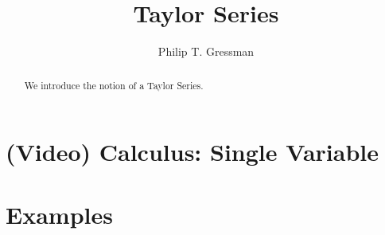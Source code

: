 \documentclass{ximera}
\title{Taylor Series}
\author{Philip T. Gressman}
\begin{document}
\begin{abstract}
We introduce the notion of a Taylor Series.
\end{abstract}
\maketitle

\section*{(Video) Calculus: Single Variable}


\section*{Examples}

\begin{example}

\end{example}

\begin{example}

\end{example}
\end{document}
